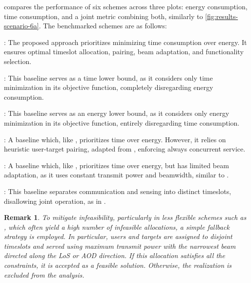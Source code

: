 \documentclass[10pt,journal,compsoc]{IEEEtran}
\newcommand\mytextsf{\bfseries\sffamily\fontsize{9pt}{9pt}\selectfont}
\theoremstyle{myremark}
\newtheorem{remark}{Remark}
\theoremstyle{myexample}
\begin{document}
 compares the performance of six schemes across three plots: energy consumption, time consumption, and a joint metric combining both, similarly to \cref{fig:results-scenario-6a}. The benchmarked schemes are as follows:

\noindent {\mytextsf{OPT}}: The proposed approach prioritizes minimizing time consumption over energy. It ensures optimal timeslot allocation, pairing, beam adaptation, and functionality selection.

\noindent {\mytextsf{TLB}}: This baseline serves as a time lower bound, as it considers only time minimization in its objective function, completely disregarding energy consumption.

\noindent {\mytextsf{ELB}}: This baseline serves as an energy lower bound, as it considers only energy minimization in its objective function, entirely disregarding time consumption.

\noindent {\mytextsf{BL1}}: A baseline which, like {\mytextsf{OPT}}, prioritizes time over energy. However, it relies on heuristic user-target pairing, adapted from \cite{dou2024:channel-sharing-aided-integrated-sensing-communication-energy-efficient-sensing-scheduling-approach}, enforcing always concurrent service.

\noindent {\mytextsf{BL2}}: A baseline which, like {\mytextsf{OPT}}, prioritizes time over energy, but has limited beam adaptation, as it uses constant transmit power and beamwidth, similar to \cite{xiao2024:simultaneous-multi-beam-sweeping-mmwave-massive-mimo-integrated-sensing-communication, rahman2019:joint-communication-radar-sensing-5g-mobile-network-compressive-sensing}.

\noindent {\mytextsf{BL3}}: This baseline separates communication and sensing into distinct timeslots, disallowing joint operation, as in \cite{li2022:multi-point-integrated-sensing-communication-fusion-model-functionality-selection}.


\begin{remark} \label{rem:note-1}
	To mitigate infeasibility, particularly in less flexible schemes such as {\mytextsf{BL1}}, which often yield a high number of infeasible allocations, a simple fallback strategy is employed. In particular, users and targets are assigned to disjoint timeslots and served using maximum transmit power with the narrowest beam directed along the \gls{LoS} or \gls{AOD} direction. If this allocation satisfies all the constraints, it is accepted as a feasible solution. Otherwise, the realization is excluded from the analysis.
\end{remark}
\end{document}
